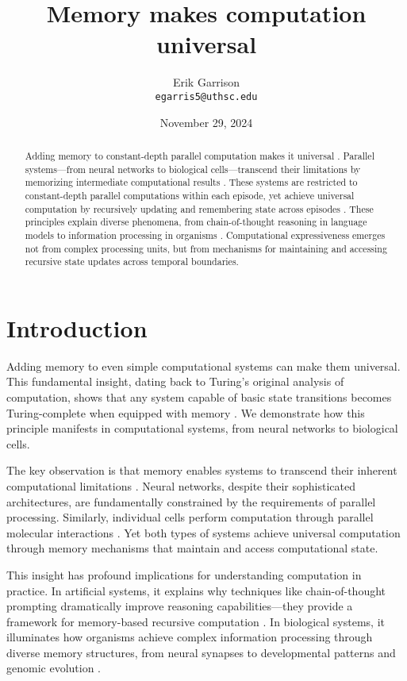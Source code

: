 \documentclass[12pt]{article}
\title{Memory makes computation universal}
\author{Erik Garrison\\
  \texttt{egarris5@uthsc.edu}\\[1ex]
  }
\date{November 29, 2024}
\begin{document}
\maketitle

\begin{abstract}
Adding memory to constant-depth parallel computation makes it universal \cite{merrill2023parallelism,peng2024limitations}.
Parallel systems---from neural networks to biological cells---transcend their limitations by memorizing intermediate computational results \cite{wang2023parallel}.
These systems are restricted to constant-depth parallel computations within each episode, yet achieve universal computation by recursively updating and remembering state across episodes \cite{cai2024efficient}.
These principles explain diverse phenomena, from chain-of-thought reasoning in language models \cite{wei2022chain,dickson2024trust} to information processing in organisms \cite{wang2023parallel}.
Computational expressiveness emerges not from complex processing units, but from mechanisms for maintaining and accessing recursive state updates across temporal boundaries.
\end{abstract}

\section{Introduction}
Adding memory to even simple computational systems can make them universal. This fundamental insight, dating back to Turing's original analysis of computation, shows that any system capable of basic state transitions becomes Turing-complete when equipped with memory \cite{swamy1983space,bisaz2024memory}. We demonstrate how this principle manifests in computational systems, from neural networks to biological cells.

The key observation is that memory enables systems to transcend their inherent computational limitations \cite{barrett2019analyzing,ganguli2018intertwined}. Neural networks, despite their sophisticated architectures, are fundamentally constrained by the requirements of parallel processing. Similarly, individual cells perform computation through parallel molecular interactions \cite{fu2023scgrn,hoel2020emergence}. Yet both types of systems achieve universal computation through memory mechanisms that maintain and access computational state.

This insight has profound implications for understanding computation in practice. In artificial systems, it explains why techniques like chain-of-thought prompting dramatically improve reasoning capabilities---they provide a framework for memory-based recursive computation \cite{wei2022chain,ahn2024recursive}. In biological systems, it illuminates how organisms achieve complex information processing through diverse memory structures, from neural synapses to developmental patterns and genomic evolution \cite{burrill2010making,espinosa2024molecular}.
\end{document}
